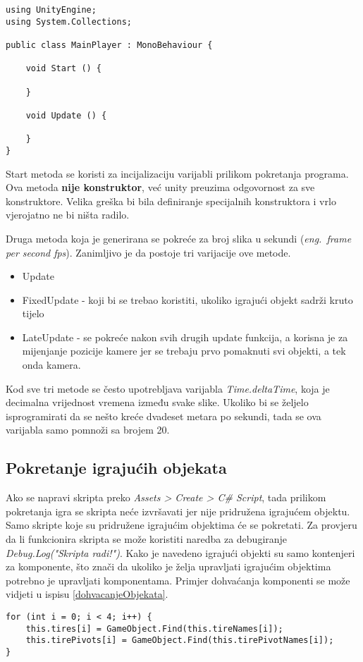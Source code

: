 \begin{lstlisting}[caption={Primjer skripte}, label=primjerSkripte]
using UnityEngine;
using System.Collections;

public class MainPlayer : MonoBehaviour {

    void Start () {
    
    }
    
    void Update () {
    
    }
}
\end{lstlisting}
Start metoda se koristi za incijalizaciju varijabli prilikom pokretanja programa. Ova metoda \textbf{nije konstruktor}, već unity preuzima odgovornost za sve konstruktore. Velika greška bi bila definiranje specijalnih konstruktora i vrlo vjerojatno ne bi ništa radilo. \par
Druga metoda koja je generirana se pokreće za broj slika u sekundi (\emph{eng.~frame per second fps}). Zanimljivo je da postoje tri varijacije ove metode.
\begin{itemize} 
	\item Update
	\item FixedUpdate - koji bi se trebao koristiti, ukoliko igrajući objekt sadrži kruto tijelo
	\item LateUpdate - se pokreće nakon svih drugih update funkcija, a korisna je za mijenjanje pozicije kamere jer se trebaju prvo pomaknuti svi objekti, a tek onda kamera. 
\end{itemize}
Kod sve tri metode se često upotrebljava varijabla \textit{Time.deltaTime}, koja je decimalna vrijednost vremena između svake slike. Ukoliko bi se željelo isprogramirati da se nešto kreće dvadeset metara po sekundi, tada se ova varijabla samo pomnoži sa brojem 20.
\subsection{Pokretanje igrajućih objekata}
Ako se napravi skripta preko \emph{Assets > Create > C\# Script}, tada prilikom pokretanja igra se skripta neće izvršavati jer nije pridružena igrajućem objektu. Samo skripte koje su pridružene igrajućim objektima će se pokretati. Za provjeru da li funkcionira skripta se može koristiti naredba za debugiranje \emph{Debug.Log("Skripta radi!")}. Kako je navedeno igrajući objekti su samo kontenjeri za komponente, što znači da ukoliko je želja upravljati igrajućim objektima potrebno je upravljati komponentama. Primjer dohvaćanja komponenti se može vidjeti u ispisu \ref{dohvacanjeObjekata}. 
\begin{lstlisting}[caption={Dohvaćanje objekata}, label=dohvacanjeObjekata]
for (int i = 0; i < 4; i++) {
	this.tires[i] = GameObject.Find(this.tireNames[i]);
	this.tirePivots[i] = GameObject.Find(this.tirePivotNames[i]);
}
\end{lstlisting}
